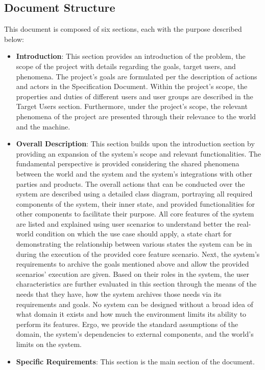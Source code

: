 \subsection{Document Structure}
This document is composed of six sections, each with the purpose described below: \\
\begin{itemize}
    \item \textbf{Introduction}: This section provides an introduction of the problem, the scope of the project with details regarding the goals, target users, and phenomena.
    The project's goals are formulated per the description of actions and actors in the Specification Document.
    Within the project's scope, the properties and duties of different users and user groups are described in the Target Users section.
    Furthermore, under the project's scope, the relevant phenomena of the project are presented through their relevance to the world and the machine.
    \item \textbf{Overall Description}: This section builds upon the introduction section by providing an expansion of the system's scope and relevant functionalities.
    The fundamental perspective is provided considering the shared phenomena between the world and the system and the system's integrations with other parties and products.
    The overall actions that can be conducted over the system are described using a detailed class diagram, portraying all required components of the system, their inner state, and provided functionalities for other components to facilitate their purpose.
    All core features of the system are listed and explained using user scenarios to understand better the real-world condition on which the use case should apply, a state chart for demonstrating the relationship between various states the system can be in during the execution of the provided core feature scenario.
    Next, the system's requirements to archive the goals mentioned above and allow the provided scenarios' execution are given.
    Based on their roles in the system, the user characteristics are further evaluated in this section through the means of the needs that they have, how the system archives those needs via its requirements and goals.
    No system can be designed without a broad idea of what domain it exists and how much the environment limits its ability to perform its features.
    Ergo, we provide the standard assumptions of the domain, the system's dependencies to external components, and the world's limits on the system.
    \item \textbf{Specific Requirements}: This section is the main section of the document.

\end{itemize}
